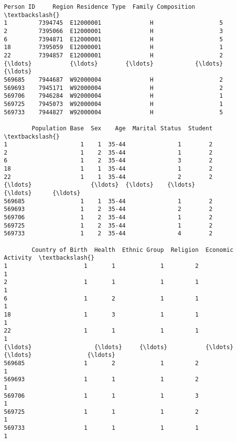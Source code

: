 \documentclass[11pt]{article}
\makeatletter
\newcommand{\boxspacing}{\kern\kvtcb@left@rule\kern\kvtcb@boxsep}
\newcommand{\prompt}[4]{
        {\ttfamily\llap{{\color{#2}[#3]:\hspace{3pt}#4}}\vspace{-\baselineskip}}
    }
\makeatother
\begin{document}
            \begin{tcolorbox}[breakable, size=fbox, boxrule=.5pt, pad at break*=1mm, opacityfill=0]
\prompt{Out}{outcolor}{7}{\boxspacing}
\begin{Verbatim}[commandchars=\\\{\}]
        Person ID     Region Residence Type  Family Composition  \textbackslash{}
1         7394745  E12000001              H                   5
2         7395066  E12000001              H                   3
6         7394871  E12000001              H                   5
18        7395059  E12000001              H                   1
22        7394857  E12000001              H                   2
{\ldots}           {\ldots}        {\ldots}            {\ldots}                 {\ldots}
569685    7944687  W92000004              H                   2
569693    7945171  W92000004              H                   2
569706    7946284  W92000004              H                   1
569725    7945073  W92000004              H                   1
569733    7944827  W92000004              H                   5

        Population Base  Sex    Age  Marital Status  Student  \textbackslash{}
1                     1    1  35-44               1        2
2                     1    2  35-44               1        2
6                     1    2  35-44               3        2
18                    1    1  35-44               1        2
22                    1    1  35-44               2        2
{\ldots}                 {\ldots}  {\ldots}    {\ldots}             {\ldots}      {\ldots}
569685                1    1  35-44               1        2
569693                1    2  35-44               2        2
569706                1    2  35-44               1        2
569725                1    2  35-44               1        2
569733                1    2  35-44               4        2

        Country of Birth  Health  Ethnic Group  Religion  Economic Activity  \textbackslash{}
1                      1       1             1         2                  1
2                      1       1             1         1                  1
6                      1       2             1         1                  1
18                     1       3             1         1                  1
22                     1       1             1         1                  1
{\ldots}                  {\ldots}     {\ldots}           {\ldots}       {\ldots}                {\ldots}
569685                 1       2             1         2                  1
569693                 1       1             1         2                  1
569706                 1       1             1         3                  1
569725                 1       1             1         2                  1
569733                 1       1             1         1                  1


\end{Verbatim}
\end{tcolorbox}
\end{document}
